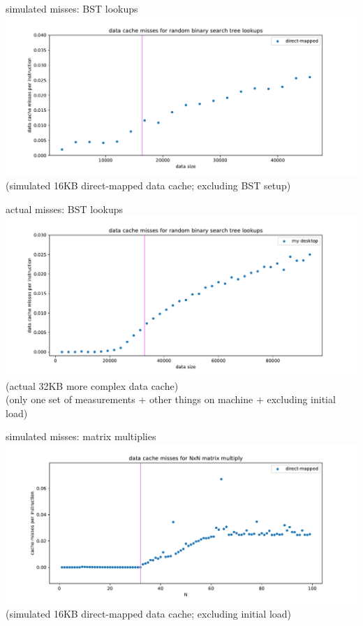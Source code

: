 \begin{frame}{simulated misses: BST lookups}
\includegraphics[width=\textwidth]{../caching/bst-one}
(simulated 16KB direct-mapped data cache; excluding BST setup)
\end{frame}

\begin{frame}{actual misses: BST lookups}
\includegraphics[width=\textwidth]{../caching/bst-act}
(actual 32KB more complex data cache) \\
\small (only one set of measurements + other things on machine + excluding initial load)
\end{frame}


\begin{frame}{simulated misses: matrix multiplies}
\includegraphics[width=\textwidth]{../caching/mm-one}
(simulated 16KB direct-mapped data cache; excluding initial load)
\end{frame}

